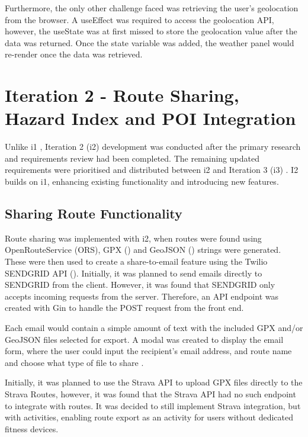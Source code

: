 Furthermore, the only other challenge faced was retrieving the user's geolocation from the browser. A useEffect was required to access the geolocation API, however, the useState was at first missed to store the geolocation value after the data was returned. Once the state variable was added, the weather panel would re-render once the data was retrieved.

\section{Iteration 2 - Route Sharing, Hazard Index and POI Integration}
\label{implementation:iteration2}

Unlike i1 , Iteration 2 (i2) development was conducted after the primary research  and requirements review  had been completed. The remaining updated requirements were prioritised and distributed between i2 and Iteration 3 (i3) . I2 builds on i1, enhancing existing functionality and introducing new features. 

\subsection{Sharing Route Functionality}
\label{iteration2:sharing-route}

Route sharing was implemented with i2, when routes were found using OpenRouteService (ORS), GPX (\cite{noauthor_gpx_nodate}) and GeoJSON (\cite{noauthor_geojson_nodate}) strings were generated. These were then used to create a share-to-email feature using the Twilio SENDGRID API (\cite{noauthor_email_nodate}). Initially, it was planned to send emails directly to SENDGRID from the client. However, it was found that SENDGRID only accepts incoming requests from the server. Therefore, an API endpoint was created with Gin to handle the POST request from the front end. 

Each email would contain a simple amount of text with the included GPX and/or GeoJSON files selected for export. A modal was created to display the email form, where the user could input the recipient's email address, and route name and choose what type of file to share .

Initially, it was planned to use the Strava API to upload GPX files directly to the Strava Routes, however, it was found that the Strava API had no such endpoint to integrate with routes. It was decided to still implement Strava integration, but with activities, enabling route export as an activity for users without dedicated fitness devices. 

